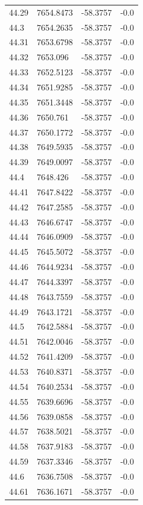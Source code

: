 \begin{table}[H]
\begin{tabular}{llll}
44.29 & 7654.8473 & -58.3757 & -0.0 \\
44.3 & 7654.2635 & -58.3757 & -0.0 \\
44.31 & 7653.6798 & -58.3757 & -0.0 \\
44.32 & 7653.096 & -58.3757 & -0.0 \\
44.33 & 7652.5123 & -58.3757 & -0.0 \\
44.34 & 7651.9285 & -58.3757 & -0.0 \\
44.35 & 7651.3448 & -58.3757 & -0.0 \\
44.36 & 7650.761 & -58.3757 & -0.0 \\
44.37 & 7650.1772 & -58.3757 & -0.0 \\
44.38 & 7649.5935 & -58.3757 & -0.0 \\
44.39 & 7649.0097 & -58.3757 & -0.0 \\
44.4 & 7648.426 & -58.3757 & -0.0 \\
44.41 & 7647.8422 & -58.3757 & -0.0 \\
44.42 & 7647.2585 & -58.3757 & -0.0 \\
44.43 & 7646.6747 & -58.3757 & -0.0 \\
44.44 & 7646.0909 & -58.3757 & -0.0 \\
44.45 & 7645.5072 & -58.3757 & -0.0 \\
44.46 & 7644.9234 & -58.3757 & -0.0 \\
44.47 & 7644.3397 & -58.3757 & -0.0 \\
44.48 & 7643.7559 & -58.3757 & -0.0 \\
44.49 & 7643.1721 & -58.3757 & -0.0 \\
44.5 & 7642.5884 & -58.3757 & -0.0 \\
44.51 & 7642.0046 & -58.3757 & -0.0 \\
44.52 & 7641.4209 & -58.3757 & -0.0 \\
44.53 & 7640.8371 & -58.3757 & -0.0 \\
44.54 & 7640.2534 & -58.3757 & -0.0 \\
44.55 & 7639.6696 & -58.3757 & -0.0 \\
44.56 & 7639.0858 & -58.3757 & -0.0 \\
44.57 & 7638.5021 & -58.3757 & -0.0 \\
44.58 & 7637.9183 & -58.3757 & -0.0 \\
44.59 & 7637.3346 & -58.3757 & -0.0 \\
44.6 & 7636.7508 & -58.3757 & -0.0 \\
44.61 & 7636.1671 & -58.3757 & -0.0 \\

\end{tabular}
\end{table}
